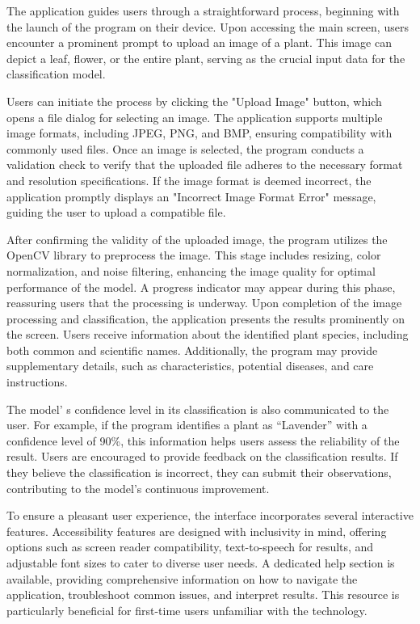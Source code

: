 \begin{multicols}{2}
The application guides users through a straightforward process,
beginning with the launch of the program on their device. Upon accessing
the main screen, users encounter a prominent prompt to upload an image
of a plant. This image can depict a leaf, flower, or the entire plant,
serving as the crucial input data for the classification model.

Users can initiate the process by clicking the "Upload Image" button,
which opens a file dialog for selecting an image. The application
supports multiple image formats, including JPEG, PNG, and BMP, ensuring
compatibility with commonly used files. Once an image is selected, the
program conducts a validation check to verify that the uploaded file
adheres to the necessary format and resolution specifications. If the
image format is deemed incorrect, the application promptly displays an
"Incorrect Image Format Error" message, guiding the user to upload a
compatible file.

After confirming the validity of the uploaded image, the program
utilizes the OpenCV library to preprocess the image. This stage includes
resizing, color normalization, and noise filtering, enhancing the image
quality for optimal performance of the model. A progress indicator may
appear during this phase, reassuring users that the processing is
underway. Upon completion of the image processing and classification,
the application presents the results prominently on the screen. Users
receive information about the identified plant species, including both
common and scientific names. Additionally, the program may provide
supplementary details, such as characteristics, potential diseases, and
care instructions.

The model' s confidence level in its classification is
also communicated to the user. For example, if the program identifies a
plant as ``Lavender'' with a confidence level of 90\%, this information
helps users assess the reliability of the result. Users are encouraged
to provide feedback on the classification results. If they believe the
classification is incorrect, they can submit their observations,
contributing to the model's continuous improvement.

To ensure a pleasant user experience, the interface incorporates several
interactive features. Accessibility features are designed with
inclusivity in mind, offering options such as screen reader
compatibility, text-to-speech for results, and adjustable font sizes to
cater to diverse user needs. A dedicated help section is available,
providing comprehensive information on how to navigate the application,
troubleshoot common issues, and interpret results. This resource is
particularly beneficial for first-time users unfamiliar with the
technology.


\end{multicols}
